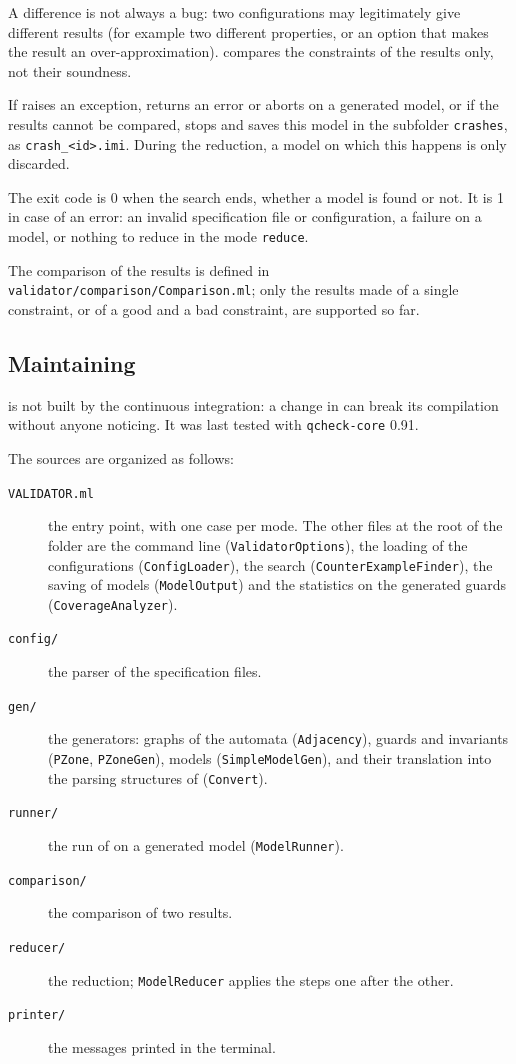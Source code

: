 A difference is not always a bug: two configurations may legitimately give different results (for example two different properties, or an option that makes the result an over-approximation).
\validator{} compares the constraints of the results only, not their soundness.

If \imitator{} raises an exception, returns an error or aborts on a generated model, or if the results cannot be compared, \validator{} stops and saves this model in the subfolder \texttt{crashes}, as \texttt{crash\_<id>.imi}.
During the reduction, a model on which this happens is only discarded.

The exit code is 0 when the search ends, whether a model is found or not.
It is 1 in case of an error: an invalid specification file or configuration, a failure on a model, or nothing to reduce in the mode \texttt{reduce}.

The comparison of the results is defined in \texttt{validator/comparison/Comparison.ml}; only the results made of a single constraint, or of a good and a bad constraint, are supported so far.

\subsection{Maintaining \validator{}}

\validator{} is not built by the continuous integration: a change in \imitator{} can break its compilation without anyone noticing.
It was last tested with \texttt{qcheck-core} 0.91.

The sources are organized as follows:

\begin{description}
	\item[\texttt{VALIDATOR.ml}] the entry point, with one case per mode. The other files at the root of the folder are the command line (\texttt{ValidatorOptions}), the loading of the configurations (\texttt{ConfigLoader}), the search (\texttt{CounterExampleFinder}), the saving of models (\texttt{ModelOutput}) and the statistics on the generated guards (\texttt{CoverageAnalyzer}).
	\item[\texttt{config/}] the parser of the specification files.
	\item[\texttt{gen/}] the generators: graphs of the automata (\texttt{Adjacency}), guards and invariants (\texttt{PZone}, \texttt{PZoneGen}), models (\texttt{SimpleModelGen}), and their translation into the parsing structures of \imitator{} (\texttt{Convert}).
	\item[\texttt{runner/}] the run of \imitator{} on a generated model (\texttt{ModelRunner}).
	\item[\texttt{comparison/}] the comparison of two results.
	\item[\texttt{reducer/}] the reduction; \texttt{ModelReducer} applies the steps one after the other.
	\item[\texttt{printer/}] the messages printed in the terminal.
\end{description}

